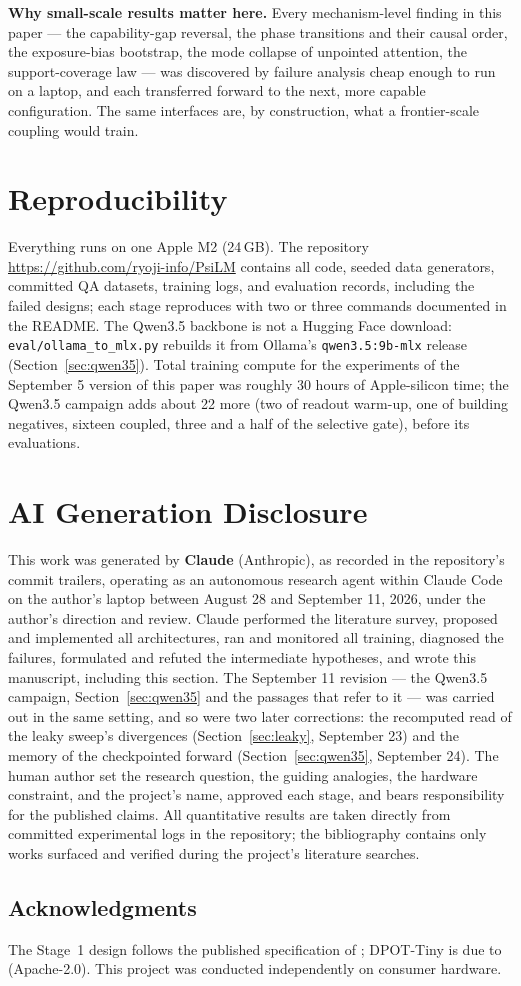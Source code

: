 \documentclass[11pt]{article}
\newcommand{\code}[1]{\texttt{#1}}
\begin{document}
\textbf{Why small-scale results matter here.} Every mechanism-level finding in this paper --- the capability-gap reversal, the phase transitions and their causal order, the exposure-bias bootstrap, the mode collapse of unpointed attention, the support-coverage law --- was discovered by failure analysis cheap enough to run on a laptop, and each transferred forward to the next, more capable configuration. The same interfaces are, by construction, what a frontier-scale coupling would train.

\section{Reproducibility}
Everything runs on one Apple M2 (24\,GB). The repository \url{https://github.com/ryoji-info/PsiLM} contains all code, seeded data generators, committed QA datasets, training logs, and evaluation records, including the failed designs; each stage reproduces with two or three commands documented in the README. The Qwen3.5 backbone is not a Hugging Face download: \code{eval/ollama\_to\_mlx.py} rebuilds it from Ollama's \code{qwen3.5:9b-mlx} release (Section~\ref{sec:qwen35}). Total training compute for the experiments of the September 5 version of this paper was roughly 30 hours of Apple-silicon time; the Qwen3.5 campaign adds about 22 more (two of readout warm-up, one of building negatives, sixteen coupled, three and a half of the selective gate), before its evaluations.

\section{AI Generation Disclosure}
\label{sec:disclosure}
This work was generated by \textbf{Claude} (Anthropic), as recorded in the repository's commit trailers, operating as an autonomous research agent within Claude Code on the author's laptop between August 28 and September 11, 2026, under the author's direction and review. Claude performed the literature survey, proposed and implemented all architectures, ran and monitored all training, diagnosed the failures, formulated and refuted the intermediate hypotheses, and wrote this manuscript, including this section. The September 11 revision --- the Qwen3.5 campaign, Section~\ref{sec:qwen35} and the passages that refer to it --- was carried out in the same setting, and so were two later corrections: the recomputed read of the leaky sweep's divergences (Section~\ref{sec:leaky}, September 23) and the memory of the checkpointed forward (Section~\ref{sec:qwen35}, September 24). The human author set the research question, the guiding analogies, the hardware constraint, and the project's name, approved each stage, and bears responsibility for the published claims. All quantitative results are taken directly from committed experimental logs in the repository; the bibliography contains only works surfaced and verified during the project's literature searches.

\subsection*{Acknowledgments}
The Stage~1 design follows the published specification of \citet{flamant2026bicameral}; DPOT-Tiny is due to \citet{hao2024dpot} (Apache-2.0). This project was conducted independently on consumer hardware.



\end{document}
